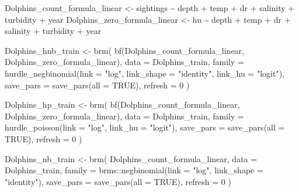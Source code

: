 \documentclass[
  english,
  letterpaper,
  DIV=11,
  numbers=noendperiod]{scrartcl}
\newenvironment{Shaded}{\begin{snugshade}}{\end{snugshade}}
\newcommand{\AttributeTok}[1]{\textcolor[rgb]{0.40,0.45,0.13}{#1}}
\newcommand{\ConstantTok}[1]{\textcolor[rgb]{0.56,0.35,0.01}{#1}}
\newcommand{\DecValTok}[1]{\textcolor[rgb]{0.68,0.00,0.00}{#1}}
\newcommand{\FunctionTok}[1]{\textcolor[rgb]{0.28,0.35,0.67}{#1}}
\newcommand{\NormalTok}[1]{\textcolor[rgb]{0.00,0.23,0.31}{#1}}
\newcommand{\OtherTok}[1]{\textcolor[rgb]{0.00,0.23,0.31}{#1}}
\newcommand{\SpecialCharTok}[1]{\textcolor[rgb]{0.37,0.37,0.37}{#1}}
\newcommand{\StringTok}[1]{\textcolor[rgb]{0.13,0.47,0.30}{#1}}
\begin{document}
\begin{Shaded}
\begin{Highlighting}[]
\NormalTok{  Dolphins\_count\_formula\_linear }\OtherTok{\textless{}{-}}\NormalTok{ sightings }\SpecialCharTok{\textasciitilde{}}\NormalTok{ depth }\SpecialCharTok{+}\NormalTok{ temp }\SpecialCharTok{+}\NormalTok{ dr }\SpecialCharTok{+}\NormalTok{ salinity }\SpecialCharTok{+}\NormalTok{ turbidity }\SpecialCharTok{+}\NormalTok{ year}
\NormalTok{  Dolphins\_zero\_formula\_linear  }\OtherTok{\textless{}{-}}\NormalTok{ hu }\SpecialCharTok{\textasciitilde{}}\NormalTok{ depth }\SpecialCharTok{+}\NormalTok{ temp }\SpecialCharTok{+}\NormalTok{ dr }\SpecialCharTok{+}\NormalTok{ salinity }\SpecialCharTok{+}\NormalTok{ turbidity }\SpecialCharTok{+}\NormalTok{ year}

\NormalTok{  Dolphins\_hnb\_train }\OtherTok{\textless{}{-}} \FunctionTok{brm}\NormalTok{(}
    \FunctionTok{bf}\NormalTok{(Dolphins\_count\_formula\_linear, Dolphins\_zero\_formula\_linear),}
    \AttributeTok{data   =}\NormalTok{ Dolphins\_train,}
    \AttributeTok{family =} \FunctionTok{hurdle\_negbinomial}\NormalTok{(}\AttributeTok{link =} \StringTok{"log"}\NormalTok{, }\AttributeTok{link\_shape =} \StringTok{"identity"}\NormalTok{, }\AttributeTok{link\_hu =} \StringTok{"logit"}\NormalTok{),}
    \AttributeTok{save\_pars =} \FunctionTok{save\_pars}\NormalTok{(}\AttributeTok{all =} \ConstantTok{TRUE}\NormalTok{),}
    \AttributeTok{refresh   =} \DecValTok{0}
\NormalTok{  )}

\NormalTok{  Dolphins\_hp\_train }\OtherTok{\textless{}{-}} \FunctionTok{brm}\NormalTok{(}
    \FunctionTok{bf}\NormalTok{(Dolphins\_count\_formula\_linear, Dolphins\_zero\_formula\_linear),}
    \AttributeTok{data   =}\NormalTok{ Dolphins\_train,}
    \AttributeTok{family =} \FunctionTok{hurdle\_poisson}\NormalTok{(}\AttributeTok{link =} \StringTok{"log"}\NormalTok{, }\AttributeTok{link\_hu =} \StringTok{"logit"}\NormalTok{),}
    \AttributeTok{save\_pars =} \FunctionTok{save\_pars}\NormalTok{(}\AttributeTok{all =} \ConstantTok{TRUE}\NormalTok{),}
    \AttributeTok{refresh   =} \DecValTok{0}
\NormalTok{  )}

\NormalTok{  Dolphins\_nb\_train }\OtherTok{\textless{}{-}} \FunctionTok{brm}\NormalTok{(}
\NormalTok{    Dolphins\_count\_formula\_linear,}
    \AttributeTok{data   =}\NormalTok{ Dolphins\_train,}
    \AttributeTok{family =}\NormalTok{ brms}\SpecialCharTok{::}\FunctionTok{negbinomial}\NormalTok{(}\AttributeTok{link =} \StringTok{"log"}\NormalTok{, }\AttributeTok{link\_shape =} \StringTok{"identity"}\NormalTok{),}
    \AttributeTok{save\_pars =} \FunctionTok{save\_pars}\NormalTok{(}\AttributeTok{all =} \ConstantTok{TRUE}\NormalTok{),}
    \AttributeTok{refresh   =} \DecValTok{0}
\NormalTok{  )}


\end{Highlighting}
\end{Shaded}
\end{document}
